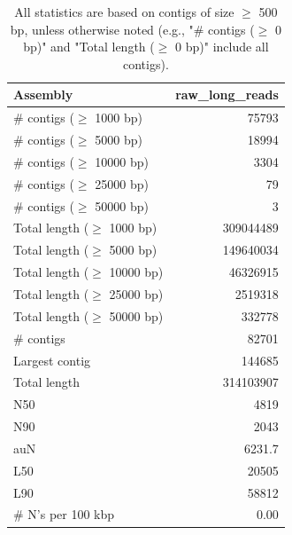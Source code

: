 \documentclass[12pt,a4paper]{article}
\begin{document}
\begin{table}[ht]
\begin{center}
\caption{All statistics are based on contigs of size $\geq$ 500 bp, unless otherwise noted (e.g., "\# contigs ($\geq$ 0 bp)" and "Total length ($\geq$ 0 bp)" include all contigs).}
\begin{tabular}{|l*{1}{|r}|}
\hline
Assembly & raw\_long\_reads \\ \hline
\# contigs ($\geq$ 1000 bp) & 75793 \\ \hline
\# contigs ($\geq$ 5000 bp) & 18994 \\ \hline
\# contigs ($\geq$ 10000 bp) & 3304 \\ \hline
\# contigs ($\geq$ 25000 bp) & 79 \\ \hline
\# contigs ($\geq$ 50000 bp) & 3 \\ \hline
Total length ($\geq$ 1000 bp) & 309044489 \\ \hline
Total length ($\geq$ 5000 bp) & 149640034 \\ \hline
Total length ($\geq$ 10000 bp) & 46326915 \\ \hline
Total length ($\geq$ 25000 bp) & 2519318 \\ \hline
Total length ($\geq$ 50000 bp) & 332778 \\ \hline
\# contigs & 82701 \\ \hline
Largest contig & 144685 \\ \hline
Total length & 314103907 \\ \hline
N50 & 4819 \\ \hline
N90 & 2043 \\ \hline
auN & 6231.7 \\ \hline
L50 & 20505 \\ \hline
L90 & 58812 \\ \hline
\# N's per 100 kbp & 0.00 \\ \hline
\end{tabular}
\end{center}
\end{table}
\end{document}
